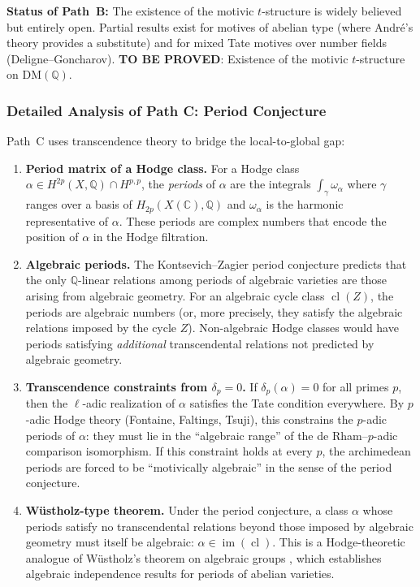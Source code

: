 \documentclass[11pt]{article}
\theoremstyle{definition}
\DeclareMathOperator{\cl}{cl}
\DeclareMathOperator{\im}{im}
\begin{document}
\noindent
\textbf{Status of Path~B:} The existence of the motivic $t$-structure
is widely believed but entirely open.  Partial results exist for motives
of abelian type (where Andr\'e's theory provides a substitute) and for
mixed Tate motives over number fields (Deligne--Goncharov).
\textbf{TO BE PROVED}: Existence of the motivic $t$-structure on
$\mathrm{DM}(\mathbb{Q})$.

\subsubsection{Detailed Analysis of Path C: Period Conjecture}
\label{sec:path-C-detail}

Path~C uses transcendence theory to bridge the local-to-global gap:

\begin{enumerate}[label=\textbf{(C\arabic*)}]
  \item \textbf{Period matrix of a Hodge class.}
    For a Hodge class $\alpha \in H^{2p}(X, \mathbb{Q}) \cap H^{p,p}$,
    the \emph{periods} of $\alpha$ are the integrals
    $\int_\gamma \omega_\alpha$ where $\gamma$ ranges over a basis of
    $H_{2p}(X(\mathbb{C}), \mathbb{Q})$ and $\omega_\alpha$ is the
    harmonic representative of $\alpha$.  These periods are complex
    numbers that encode the position of $\alpha$ in the Hodge filtration.

  \item \textbf{Algebraic periods.}
    The Kontsevich--Zagier period conjecture \cite{KZ} predicts that
    the only $\mathbb{Q}$-linear relations among periods of algebraic
    varieties are those arising from algebraic geometry.  For an algebraic
    cycle class $\cl(Z)$, the periods are algebraic numbers (or, more
    precisely, they satisfy the algebraic relations imposed by the cycle
    $Z$).  Non-algebraic Hodge classes would have periods satisfying
    \emph{additional} transcendental relations not predicted by algebraic
    geometry.

  \item \textbf{Transcendence constraints from $\delta_p = 0$.}
    If $\delta_p(\alpha) = 0$ for all primes $p$, then the $\ell$-adic
    realization of $\alpha$ satisfies the Tate condition everywhere.  By
    $p$-adic Hodge theory (Fontaine, Faltings, Tsuji), this constrains
    the $p$-adic periods of $\alpha$: they must lie in the ``algebraic
    range'' of the de Rham--$p$-adic comparison isomorphism.  If this
    constraint holds at every $p$, the archimedean periods are forced to
    be ``motivically algebraic'' in the sense of the period conjecture.

  \item \textbf{W\"ustholz-type theorem.}
    Under the period conjecture, a class $\alpha$ whose periods satisfy
    no transcendental relations beyond those imposed by algebraic
    geometry must itself be algebraic: $\alpha \in \im(\cl)$.  This is
    a Hodge-theoretic analogue of W\"ustholz's theorem on algebraic
    groups \cite{Wustholz}, which establishes algebraic independence
    results for periods of abelian varieties.
\end{enumerate}
\end{document}

